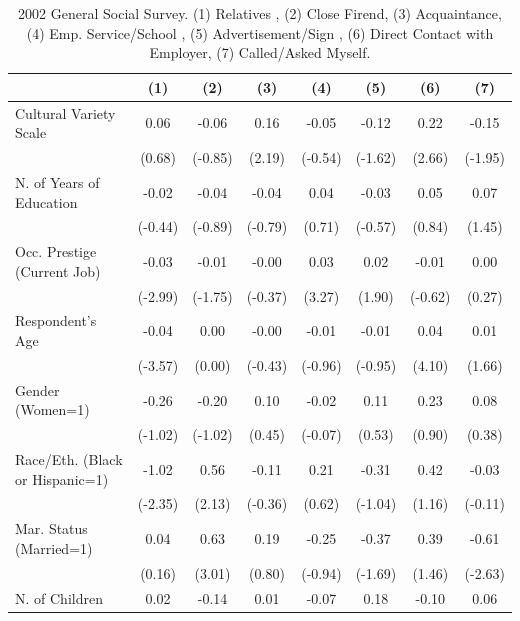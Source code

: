 \documentclass[12pt]{article}
\begin{document}
\newpage
\begin{landscape}
\begin{table}[htb!]
\caption{\footnotesize 2002 General Social Survey.  (1) Relatives , (2) Close Firend, (3) Acquaintance, (4) Emp. Service/School , (5) Advertisement/Sign , (6) Direct Contact with Employer, (7) Called/Asked Myself.}
\begin{tabular*}{\hsize}{@{\extracolsep{\fill}} l*{7}{c}} 
\hline
\hline 
&(1)&(2)&(3)&(4)&(5)&(6)&(7)\\
\hline
Cultural Variety Scale   &     0.06&    -0.06&     0.16&    -0.05&    -0.12&     0.22&    -0.15\\
                         &   (0.68)&  (-0.85)&   (2.19)&  (-0.54)&  (-1.62)&   (2.66)&  (-1.95)\\
N. of Years of Education &    -0.02&    -0.04&    -0.04&     0.04&    -0.03&     0.05&     0.07\\
                         &  (-0.44)&  (-0.89)&  (-0.79)&   (0.71)&  (-0.57)&   (0.84)&   (1.45)\\
Occ. Prestige (Current Job)&    -0.03&    -0.01&    -0.00&     0.03&     0.02&    -0.01&     0.00\\
                         &  (-2.99)&  (-1.75)&  (-0.37)&   (3.27)&   (1.90)&  (-0.62)&   (0.27)\\
Respondent's Age         &    -0.04&     0.00&    -0.00&    -0.01&    -0.01&     0.04&     0.01\\
                         &  (-3.57)&   (0.00)&  (-0.43)&  (-0.96)&  (-0.95)&   (4.10)&   (1.66)\\
Gender (Women=1)         &    -0.26&    -0.20&     0.10&    -0.02&     0.11&     0.23&     0.08\\
                         &  (-1.02)&  (-1.02)&   (0.45)&  (-0.07)&   (0.53)&   (0.90)&   (0.38)\\
Race/Eth. (Black or Hispanic=1)&    -1.02&     0.56&    -0.11&     0.21&    -0.31&     0.42&    -0.03\\
                         &  (-2.35)&   (2.13)&  (-0.36)&   (0.62)&  (-1.04)&   (1.16)&  (-0.11)\\
Mar. Status (Married=1)  &     0.04&     0.63&     0.19&    -0.25&    -0.37&     0.39&    -0.61\\
                         &   (0.16)&   (3.01)&   (0.80)&  (-0.94)&  (-1.69)&   (1.46)&  (-2.63)\\
N. of Children           &     0.02&    -0.14&     0.01&    -0.07&     0.18&    -0.10&     0.06\\

\end{tabular*}
\end{table}
\end{landscape}
\end{document}
